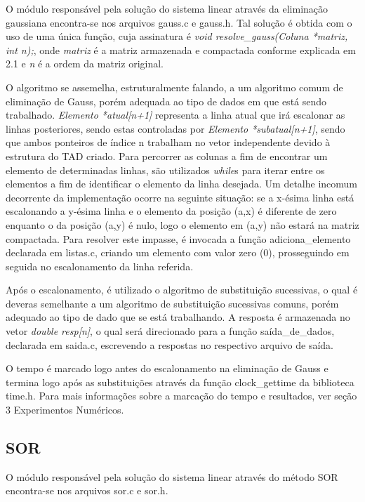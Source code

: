 \documentclass[
	article,			%
	11pt,				%
	oneside,			%
	a4paper,			%
	english,			%
	brazil,				%
	sumario=tradicional
	]{abntex2}
\begin{document}
O módulo responsável pela solução do sistema linear através da eliminação gaussiana encontra-se nos arquivos gauss.c e gauss.h. Tal solução é obtida com o uso de uma única função, cuja assinatura é \emph{void resolve\_gauss(Coluna *matriz, int n);}, onde \emph{matriz} é a matriz armazenada e compactada conforme explicada em 2.1 e \emph{n} é a ordem da matriz original.

O algoritmo se assemelha, estruturalmente falando, a um algoritmo comum de eliminação de Gauss, porém adequada ao tipo de dados em que está sendo trabalhado. \emph{Elemento *atual[n+1]} representa a linha atual que irá escalonar as linhas posteriores, sendo estas controladas por \emph{Elemento *subatual[n+1]}, sendo que ambos ponteiros de índice n trabalham no vetor independente devido à estrutura do TAD criado. Para percorrer as colunas a fim de encontrar um elemento de determinadas linhas, são utilizados \emph{while}s para iterar entre os elementos a fim de identificar o elemento da linha desejada. Um detalhe incomum decorrente da implementação ocorre na seguinte situação: se a x-ésima linha está escalonando a y-ésima linha e o elemento da posição (a,x) é diferente de zero enquanto o da posição (a,y) é nulo, logo o elemento em (a,y) não estará na matriz compactada. Para resolver este impasse, é invocada a função adiciona\_elemento declarada em listas.c, criando um elemento com valor zero (0), prosseguindo em seguida no escalonamento da linha referida.

Após o escalonamento, é utilizado o algoritmo de substituição sucessivas, o qual é deveras semelhante a um algoritmo de substituição sucessivas comuns, porém adequado ao tipo de dado que se está trabalhando. A resposta é armazenada no vetor \emph{double resp[n]}, o qual será direcionado para a função saída\_de\_dados, declarada em saida.c, escrevendo a respostas no respectivo arquivo de saída.

O tempo é marcado logo antes do escalonamento na eliminação de Gauss e termina logo após as substituições através da função clock\_gettime da biblioteca time.h. Para mais informações sobre a marcação do tempo e resultados, ver seção 3 Experimentos Numéricos.

\subsection{SOR}

O módulo responsável pela solução do sistema linear através do método SOR encontra-se nos arquivos sor.c e sor.h.
\end{document}
